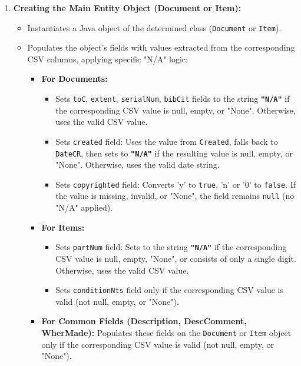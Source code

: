 \begin{enumerate}
    \item \textbf{Creating the Main Entity Object (Document or Item):}
        \begin{itemize}
            \item Instantiates a Java object of the determined class (\texttt{Document} or \texttt{Item}).
            \item Populates the object's fields with values extracted from the corresponding CSV columns, applying specific "N/A" logic:
                \begin{itemize}
                    \item \textbf{For Documents:}
                        \begin{itemize}
                        \item Sets \texttt{toC}, \texttt{extent}, \texttt{serialNum}, \texttt{bibCit} fields to the string \textbf{\texttt{"N/A"}} if the corresponding CSV value is null, empty, or "None". Otherwise, uses the valid CSV value.
                        \item Sets \texttt{created} field: Uses the value from \texttt{Created}, falls back to \texttt{DateCR}, then sets to \textbf{\texttt{"N/A"}} if the resulting value is null, empty, or "None". Otherwise, uses the valid date string.
                        \item Sets \texttt{copyrighted} field: Converts 'y' to \texttt{true}, 'n' or '0' to \texttt{false}. If the value is missing, invalid, or "None", the field remains \texttt{null} (no "N/A" applied).
                        \end{itemize}
                    \item \textbf{For Items:}
                        \begin{itemize}
                        \item Sets \texttt{partNum} field: Sets to the string \textbf{\texttt{"N/A"}} if the corresponding CSV value is null, empty, "None", or consists of only a single digit. Otherwise, uses the valid CSV value.
                        \item Sets \texttt{conditionNts} field only if the corresponding CSV value is valid (not null, empty, or "None"). 
                        \end{itemize}
                    \item \textbf{For Common Fields (Description, DescComment, WherMade):} Populates these fields on the \texttt{Document} or \texttt{Item} object only if the corresponding CSV value is valid (not null, empty, or "None").
                \end{itemize}
        \end{itemize}


\end{enumerate}
